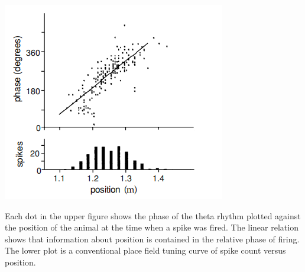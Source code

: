 \begin{center}
    \label{fig:1.18}
    \includegraphics[scale = 0.6]{./png/Figure1-18}\\
\end{center}
Each dot in the upper figure shows the phase of the theta rhythm plotted against the position of the animal at the time when a spike was fired. The linear relation shows that information about position is contained in the relative phase of firing. The lower plot is a conventional place field tuning curve of spike count versus position.

